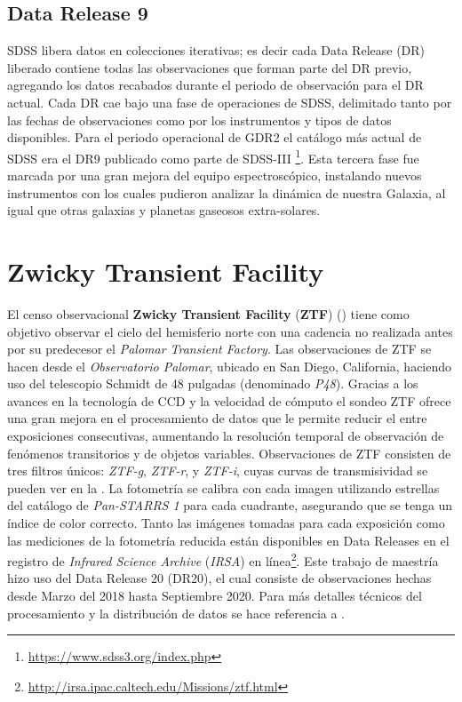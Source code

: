 \subsection{Data Release 9}

SDSS libera datos en colecciones iterativas; es decir cada Data Release (DR)
liberado contiene todas las observaciones que forman parte del DR previo,
agregando los datos recabados durante el periodo de observación para el DR
actual. Cada DR cae bajo una fase de operaciones de SDSS, delimitado tanto por
las fechas de observaciones como por los instrumentos y tipos de datos
disponibles. Para el periodo operacional de GDR2 el catálogo más actual de SDSS 
era el DR9 publicado como parte de SDSS-III
\footnote{\url{https://www.sdss3.org/index.php}}. Esta tercera fase fue marcada
por una gran mejora del equipo espectroscópico, instalando nuevos instrumentos
con los cuales pudieron analizar la dinámica de nuestra Galaxia, al igual que
otras galaxias y planetas gaseosos extra-solares. 

\section{Zwicky Transient Facility}

El censo observacional \textbf{Zwicky Transient Facility} (\textbf{ZTF})
() tiene como
objetivo observar el cielo del hemisferio norte con una cadencia no realizada
antes por su predecesor el \textit{Palomar Transient Factory}. Las observaciones
de ZTF se hacen desde el \textit{Observatorio Palomar}, ubicado en San Diego,
California, haciendo uso del telescopio Schmidt de 48 pulgadas (denominado
\textit{P48}). Gracias a los avances en la tecnología de CCD y la velocidad de
cómputo el sondeo ZTF ofrece una gran mejora en el procesamiento de datos que le
permite reducir el  entre exposiciones consecutivas,
aumentando la resolución temporal de observación de fenómenos transitorios y de
objetos variables. Observaciones de ZTF consisten de tres filtros únicos: 
\textit{ZTF-g}, \textit{ZTF-r}, y \textit{ZTF-i}, cuyas curvas de
transmisividad se pueden ver en la . La
fotometría se calibra con cada imagen utilizando estrellas del
catálogo de \textit{Pan-STARRS 1} para cada cuadrante, asegurando que se tenga
un índice de color correcto. Tanto las imágenes tomadas para cada exposición
como las mediciones de la fotometría reducida están disponibles en Data Releases
en el registro de \textit{Infrared Science Archive} (\textit{IRSA}) en
línea\footnote{\url{http://irsa.ipac.caltech.edu/Missions/ztf.html}}. Este
trabajo de maestría hizo uso del Data Release 20 (DR20), el cual consiste de
observaciones hechas desde Marzo del 2018 hasta Septiembre 2020. Para más
detalles técnicos del procesamiento y la distribución de datos se hace
referencia a .

